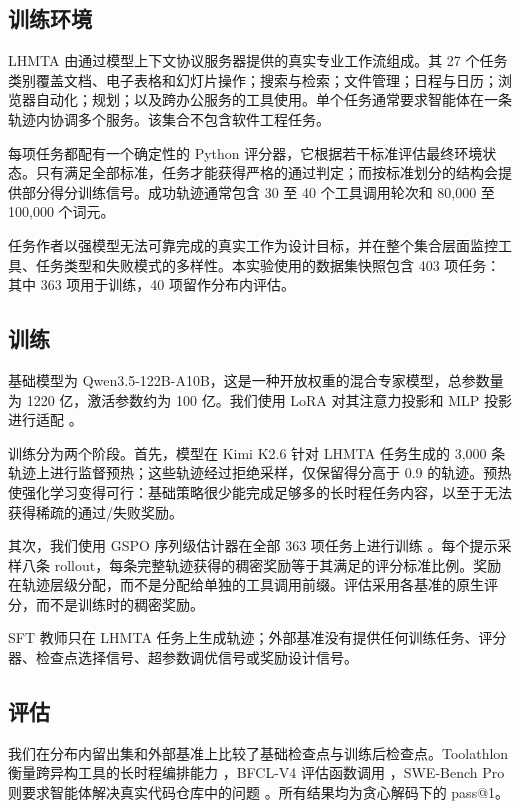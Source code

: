 \documentclass[10pt]{article}
\begin{document}
\subsection{训练环境}
\label{sec:environment}

LHMTA 由通过模型上下文协议服务器提供的真实专业工作流组成。其 27 个任务类别覆盖文档、电子表格和幻灯片操作；搜索与检索；文件管理；日程与日历；浏览器自动化；规划；以及跨办公服务的工具使用。单个任务通常要求智能体在一条轨迹内协调多个服务。该集合不包含软件工程任务。

每项任务都配有一个确定性的 Python 评分器，它根据若干标准评估最终环境状态。只有满足全部标准，任务才能获得严格的通过判定；而按标准划分的结构会提供部分得分训练信号。成功轨迹通常包含 30 至 40 个工具调用轮次和 80,000 至 100,000 个词元。

任务作者以强模型无法可靠完成的真实工作为设计目标，并在整个集合层面监控工具、任务类型和失败模式的多样性。本实验使用的数据集快照包含 403 项任务：其中 363 项用于训练，40 项留作分布内评估。

\subsection{训练}
\label{sec:training}

基础模型为 Qwen3.5-122B-A10B，这是一种开放权重的混合专家模型，总参数量为 1220 亿，激活参数约为 100 亿。我们使用 LoRA 对其注意力投影和 MLP 投影进行适配 \citep{hu2022lora}。

训练分为两个阶段。首先，模型在 Kimi K2.6 针对 LHMTA 任务生成的 3,000 条轨迹上进行监督预热；这些轨迹经过拒绝采样，仅保留得分高于 0.9 的轨迹。预热使强化学习变得可行：基础策略很少能完成足够多的长时程任务内容，以至于无法获得稀疏的通过/失败奖励。

其次，我们使用 GSPO 序列级估计器在全部 363 项任务上进行训练 \citep{zheng2025gspo}。每个提示采样八条 rollout，每条完整轨迹获得的稠密奖励等于其满足的评分标准比例。奖励在轨迹层级分配，而不是分配给单独的工具调用前缀。评估采用各基准的原生评分，而不是训练时的稠密奖励。

SFT 教师只在 LHMTA 任务上生成轨迹；外部基准没有提供任何训练任务、评分器、检查点选择信号、超参数调优信号或奖励设计信号。

\subsection{评估}
\label{sec:evaluation}

我们在分布内留出集和外部基准上比较了基础检查点与训练后检查点。Toolathlon 衡量跨异构工具的长时程编排能力 \citep{li2025toolathlon}，BFCL-V4 评估函数调用 \citep{patil2025bfcl}，SWE-Bench Pro 则要求智能体解决真实代码仓库中的问题 \citep{deng2025swebenchpro}。所有结果均为贪心解码下的 pass@1。
\end{document}
